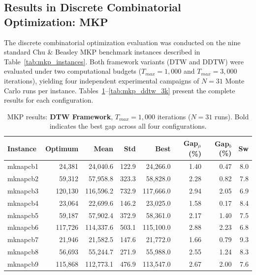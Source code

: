 \documentclass[review]{elsarticle}
\begin{document}
\subsection{Results in Discrete Combinatorial Optimization: MKP}
\label{sec:results_mkp}

The discrete combinatorial optimization evaluation was conducted on the nine standard Chu \& Beasley MKP benchmark instances described in Table~\ref{tab:mkp_instances}. Both framework variants (DTW and DDTW) were evaluated under two computational budgets ($T_{max} = 1{,}000$ and $T_{max} = 3{,}000$ iterations), yielding four independent experimental campaigns of $N = 31$ Monte Carlo runs per instance. Tables~\ref{tab:mkp_dtw_1k}--\ref{tab:mkp_ddtw_3k} present the complete results for each configuration.

\begin{table}[htbp]
\centering
\caption{MKP results: \textbf{DTW Framework}, $T_{max} = 1{,}000$ iterations ($N=31$ runs). Bold indicates the best gap across all four configurations.}
\label{tab:mkp_dtw_1k}
\begin{tabular}{lrrrrrrr}
\toprule
\textbf{Instance} & \textbf{Optimum} & \textbf{Mean} & \textbf{Std} & \textbf{Best} & \textbf{Gap$_\mu$ (\%)} & \textbf{Gap$_b$ (\%)} & \textbf{Sw} \\
\midrule
mknapcb1 & 24,381 & 24,040.6 & 122.9 & 24,266.0 & 1.40 & 0.47 & 8.0 \\
mknapcb2 & 59,312 & 57,958.8 & 323.3 & 58,828.0 & 2.28 & 0.82 & 7.8 \\
mknapcb3 & 120,130 & 116,596.2 & 732.9 & 117,666.0 & 2.94 & 2.05 & 6.9 \\
mknapcb4 & 23,064 & 22,699.6 & 146.2 & 23,025.0 & 1.58 & 0.17 & 8.4 \\
mknapcb5 & 59,187 & 57,902.4 & 372.9 & 58,361.0 & 2.17 & 1.40 & 7.5 \\
mknapcb6 & 117,726 & 114,337.6 & 503.1 & 115,100.0 & 2.88 & 2.23 & 6.8 \\
mknapcb7 & 21,946 & 21,582.5 & 147.6 & 21,772.0 & 1.66 & 0.79 & 9.3 \\
mknapcb8 & 56,693 & 55,244.7 & 271.9 & 55,988.0 & 2.55 & 1.24 & 8.3 \\
mknapcb9 & 115,868 & 112,773.1 & 476.9 & 113,547.0 & 2.67 & 2.00 & 7.6 \\
\bottomrule
\end{tabular}
\end{table}
\end{document}
